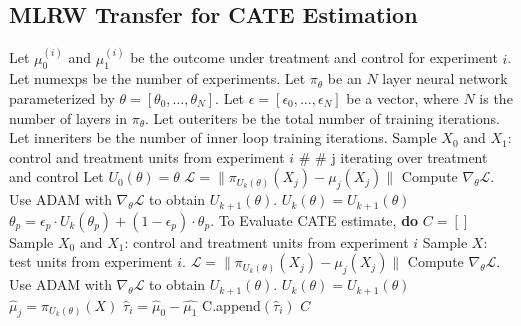 \subsection{MLRW Transfer for CATE Estimation}


\begin{algorithm}[H]
\caption{MLRW Transfer for Cate Estimation.}
\label{alg:sf-reptile-meta-regression}
\begin{algorithmic}[1]
\STATE Let $\mu_0^{(i)}$ and $\mu_1^{(i)}$ be the outcome under treatment and control for experiment $i$. 
\STATE Let numexps be the number of experiments. 
\STATE Let $\pi_\theta$ be an $N$ layer neural network parameterized by $\theta = \left[\theta_0, \dots, \theta_N \right]$.
\STATE Let $\epsilon = \left[\epsilon_0, \dots, \epsilon_N \right]$ be a vector, where $N$ is the number of layers in $\pi_\theta$. 
\STATE Let outeriters be the total number of training iterations. 
\STATE Let inneriters be the number of inner loop training iterations.
\STATE Sample $X_0$ and $X_1$: control and treatment units from experiment $i$
\STATE \# \# j iterating over treatment and control %
\STATE Let $U_0(\theta) = \theta$
\STATE $\mathcal{L} = \| \pi_{U_k(\theta)} (X_j) - \mu_j(X_j) \|$
\STATE Compute $\nabla_\theta \mathcal{L}$. 
\STATE Use ADAM with $\nabla_\theta \mathcal{L}$ to obtain $U_{k+1}(\theta)$. 
\STATE $U_k (\theta) = U_{k+1}(\theta)$
\ENDFOR
{}
\STATE $\theta_p = \epsilon_p \cdot U_k(\theta_p) + (1 - \epsilon_p) \cdot \theta_p$.  
\ENDFOR
\ENDFOR
\ENDFOR
\ENDFOR
\STATE To Evaluate CATE estimate, \textbf{do}
\STATE $C = []$
\STATE Sample $X_0$ and $X_1$: control and treatment units from experiment $i$
\STATE Sample $X$: test units from experiment $i$. 
\STATE $\mathcal{L} = \| \pi_{U_k(\theta)} (X_j) - \mu_j(X_j) \|$
\STATE Compute $\nabla_\theta \mathcal{L}$. 
\STATE Use ADAM with $\nabla_\theta \mathcal{L}$ to obtain $U_{k+1}(\theta)$. 
\STATE $U_k (\theta) = U_{k+1}(\theta)$
\ENDFOR
\STATE $\hat{\mu}_j = \pi_{U_k(\theta)} (X)$
\ENDFOR
\STATE  $\hat{\tau}_i = \hat{\mu}_0 - \hat{\mu_1}$
\STATE C.append$(\hat{\tau}_i)$
\ENDFOR
{} $C$
\end{algorithmic}
\end{algorithm}


